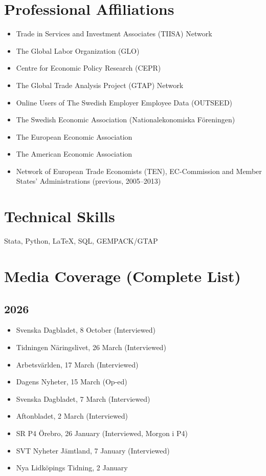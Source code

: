 \documentclass[11pt,a4paper]{article}
\newcommand{\cventry}[1]{\item #1}
\begin{document}
\section{Professional Affiliations}

\begin{itemize}
  \cventry{Trade in Services and Investment Associates (TIISA) Network}
  \cventry{The Global Labor Organization (GLO)}
  \cventry{Centre for Economic Policy Research (CEPR)}
  \cventry{The Global Trade Analysis Project (GTAP) Network}
  \cventry{Online Users of The Swedish Employer Employee Data (OUTSEED)}
  \cventry{The Swedish Economic Association (Nationalekonomiska Föreningen)}
  \cventry{The European Economic Association}
  \cventry{The American Economic Association}
  \cventry{Network of European Trade Economists (TEN), EC-Commission and Member States' Administrations (previous, 2005--2013)}
\end{itemize}

\section{Technical Skills}

Stata, Python, \LaTeX, SQL, GEMPACK/GTAP

\section{Media Coverage (Complete List)}

\subsection{2026}
\begin{itemize}
  \cventry{Svenska Dagbladet, 8 October (Interviewed)} %
  \cventry{Tidningen Näringslivet, 26 March (Interviewed)}
  \cventry{Arbetsvärlden, 17 March (Interviewed)}
  \cventry{Dagens Nyheter, 15 March (Op-ed)}
  \cventry{Svenska Dagbladet, 7 March (Interviewed)}
  \cventry{Aftonbladet, 2 March (Interviewed)}
  \cventry{SR P4 Örebro, 26 January (Interviewed, Morgon i P4)}
  \cventry{SVT Nyheter Jämtland, 7 January (Interviewed)}
  \cventry{Nya Lidköpings Tidning, 2 January}
\end{itemize}
\end{document}
